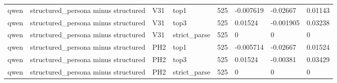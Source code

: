 \begin{tabular}{llllllll}
qwen & structured\_persona minus structured & V31 & top1 & 525 & -0.007619 & -0.02667 & 0.01143 \\
qwen & structured\_persona minus structured & V31 & top3 & 525 & 0.01524 & -0.001905 & 0.03238 \\
qwen & structured\_persona minus structured & V31 & strict\_parse & 525 & 0 & 0 & 0 \\
qwen & structured\_persona minus structured & PH2 & top1 & 525 & -0.005714 & -0.02667 & 0.01524 \\
qwen & structured\_persona minus structured & PH2 & top3 & 525 & 0.01524 & -0.00381 & 0.03429 \\
qwen & structured\_persona minus structured & PH2 & strict\_parse & 525 & 0 & 0 & 0 \\
\bottomrule
\end{tabular}
